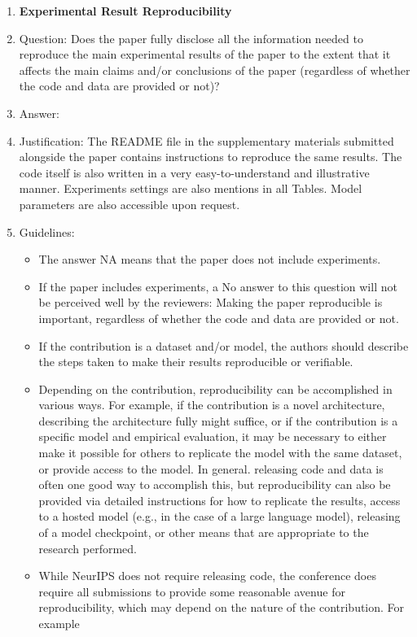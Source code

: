 \documentclass{article}
\begin{document}
\begin{enumerate}
    \item {\bf Experimental Result Reproducibility}
    \item[] Question: Does the paper fully disclose all the information needed to reproduce the main experimental results of the paper to the extent that it affects the main claims and/or conclusions of the paper (regardless of whether the code and data are provided or not)?
    \item[] Answer: \answerYes{} %
    \item[] Justification: The README file in the supplementary materials submitted alongside the paper contains instructions to reproduce the same results. The code itself is also written in a very easy-to-understand and illustrative manner. Experiments settings are also mentions in all Tables. Model parameters are also accessible upon request. 
    \item[] Guidelines:
    \begin{itemize}
        \item The answer NA means that the paper does not include experiments.
        \item If the paper includes experiments, a No answer to this question will not be perceived well by the reviewers: Making the paper reproducible is important, regardless of whether the code and data are provided or not.
        \item If the contribution is a dataset and/or model, the authors should describe the steps taken to make their results reproducible or verifiable. 
        \item Depending on the contribution, reproducibility can be accomplished in various ways. For example, if the contribution is a novel architecture, describing the architecture fully might suffice, or if the contribution is a specific model and empirical evaluation, it may be necessary to either make it possible for others to replicate the model with the same dataset, or provide access to the model. In general. releasing code and data is often one good way to accomplish this, but reproducibility can also be provided via detailed instructions for how to replicate the results, access to a hosted model (e.g., in the case of a large language model), releasing of a model checkpoint, or other means that are appropriate to the research performed.
        \item While NeurIPS does not require releasing code, the conference does require all submissions to provide some reasonable avenue for reproducibility, which may depend on the nature of the contribution. For example

\end{itemize}
\end{enumerate}
\end{document}
